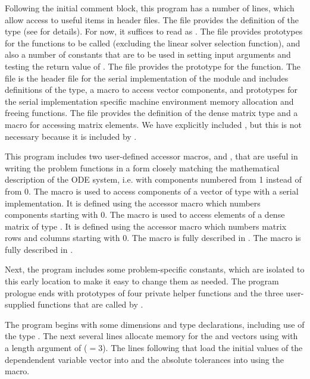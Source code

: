 Following the initial comment block, this program has a number
of  lines, which allow access to useful items in {\cvode}
header files.  The  file provides the definition of the
type  (see  for details).  
For now, it suffices to read  as .
The  file provides prototypes for the {\cvode}
functions to be called (excluding the linear solver selection
function), and also a number of constants that are to be used in
setting input arguments and testing the return value of .
The  file provides the prototype for the  function.
The  file is the header file for the serial
implementation of the {\nvector} module and includes definitions of the 
 type, a macro to access vector components, and prototypes 
for the serial implementation specific machine environment memory allocation
and freeing functions.
The  file provides the definition of the dense matrix type
 and a macro for accessing matrix elements.
We have explicitly included , but this is not necessary because 
it is included by .

This program includes two user-defined accessor macros,  and
, that are useful in writing the problem functions in a form
closely matching the mathematical description of the ODE system,
i.e. with components numbered from 1 instead of from 0.  The 
macro is used to access components of a vector of type 
with a serial implementation.  It is defined using the {\nvecs}
accessor macro  which numbers components starting with
0. The  macro is used to access elements of a dense matrix of
type . It is defined using the {\dense} accessor macro
 which numbers matrix rows and columns starting with
0. 
The macro  is fully described in .
The macro  is fully described in .

Next, the program includes some problem-specific constants, which are
isolated to this early location to make it easy to change them as needed.  
The program prologue ends with prototypes of four private helper
functions and the three user-supplied functions that are called by {\cvode}.

The  program begins with some dimensions and type declarations,
including use of the type .  The next several lines
allocate memory for the  and  vectors using
 with a length argument of  ($= 3$). The
lines following that load the initial values of the dependendent
variable vector into  and the absolute tolerances into 
using the  macro.

